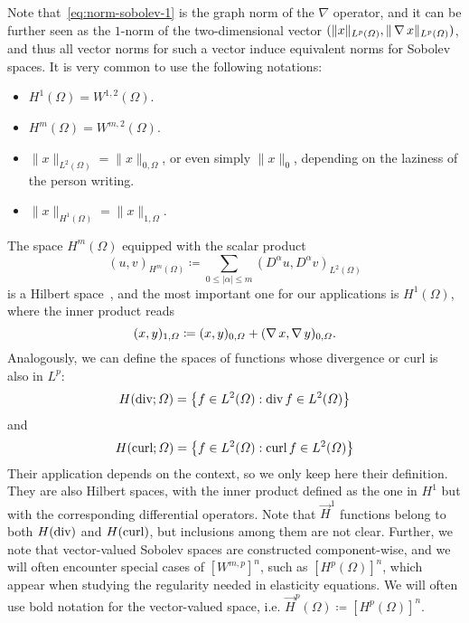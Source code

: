 Note that~\eqref{eq:norm-sobolev-1} is the graph norm of the $\nabla$ operator, and it can be further seen as the $1$-norm of the two-dimensional vector $(\|x\|_{L^p(\Omega)}, \|\operatorname{\nabla} x\|_{L^p(\Omega)})$, and thus all vector norms for such a vector induce equivalent norms for Sobolev spaces. It is very common to use the following notations:   
\begin{itemize}
    \item $H^1(\Omega) = W^{1,2}(\Omega)$.
    \item $H^m(\Omega) = W^{m,2}(\Omega)$.
    \item $\| x \|_{L^2(\Omega)} = \| x \|_{0,\Omega}$, or even simply $ \| x\|_0$, depending on the laziness of the person writing.
    \item $\| x \|_{H^1(\Omega)} = \|x\|_{1,\Omega}$.
\end{itemize}
The space $H^m(\Omega)$ equipped with the scalar product 
\begin{equation}
    (u,v)_{H^m(\Omega)} \coloneqq \sum_{0\leq |\alpha|\leq m}(D^\alpha u, D^\alpha v)_{L^2(\Omega)}
\end{equation}
is a Hilbert space~\cite{BrezisFA}, and the most important one for our applications is $H^1(\Omega)$, where the inner product reads
\begin{equation}
    (x,y)_{1,\Omega} \coloneqq (x,y)_{0,\Omega} + (\operatorname{\nabla} x, \operatorname{\nabla} y)_{0,\Omega}.
\end{equation}
Analogously, we can define the spaces of functions whose divergence or curl is also in $L^p$:
\begin{equation}\label{eq:def-hdiv}
    H(\operatorname{\text{div}}; \Omega) = \left\{f\in L^2(\Omega): \operatorname{\text{div}} f \in L^2(\Omega)\right\}
\end{equation}
and    
\begin{equation}\label{eq:def-hcurl}
    H(\operatorname{\text{curl}}; \Omega) = \left\{f\in L^2(\Omega): \operatorname{\text{curl}} f \in L^2(\Omega)\right\}
\end{equation}
Their application depends on the context, so we only keep here their definition. They are also Hilbert spaces, with the inner product defined as the one in $H^1$ but with the corresponding differential operators. Note that $\vec H^1$ functions belong to both $H(\operatorname{\text{div}})$ and $H(\operatorname{\text{curl}})$, but inclusions among them are not clear. Further, we note that vector-valued Sobolev spaces are constructed component-wise, and we will often encounter special cases of $[W^{m,p}]^n$, such as $[H^p(\Omega)]^n$, which appear when studying the regularity needed in elasticity equations. We will often use bold notation for the vector-valued space, i.e. $\vec H^p(\Omega) \coloneqq [H^p(\Omega)]^n$.

